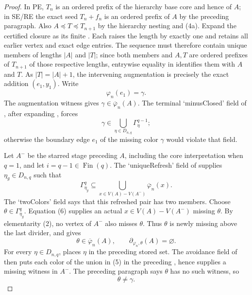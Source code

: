 \begin{proof}
In PE, $T_n$ is an ordered prefix of the hierarchy base core and hence
of $A$; in SE/RE the exact seed $T_n+f_n$ is an ordered prefix of $A$ by
the preceding paragraph.  Also $A\preceq T\preceq T_{n+1}$ by the
hierarchy nesting and (4a).  Expand the certified closure as its finite
.  Each
 raises the length by exactly one and
retains all earlier vertex and exact edge entries.  The sequence must
therefore contain unique members of lengths $|A|$ and $|T|$; since both
members and $A,T$ are ordered prefixes of $T_{n+1}$ of those respective
lengths, entrywise equality in 
identifies them with $A$ and $T$.  As $|T|=|A|+1$, the intervening
augmentation is precisely the exact addition $(e_1,y_1)$.  Write
\[
                         \varphi_n(e_1)=\gamma.                \tag{4}
\]
The augmentation witness gives
$\gamma\in\overline\varphi_n(A)$.  The terminal `minusClosed' field of
, after expanding
, forces
\[
 \gamma\in
   \bigcup_{\eta\in D_{n,q}}\Gamma^{q-1}_\eta;               \tag{5}
\]
otherwise the boundary edge $e_1$ of the missing color $\gamma$ would
violate that field.

Let $A^-$ be the starred stage preceding $A$, including the core
interpretation when $q=1$, and let $i=q-1\in\operatorname{Fin}(q)$.
The `uniqueRefresh' field of  supplies
$\eta_g\in D_{n,q}$ such that
\[
 \Gamma^q_{\eta_g}\subseteq
 \bigcup_{x\in V(A)-V(A^-)}\overline\varphi_n(x).             \tag{6}
\]
The `twoColors' field says that this refreshed pair has two members.
Choose $\theta\in\Gamma^q_{\eta_g}$.  Equation (6) supplies an actual
$x\in V(A)-V(A^-)$ missing $\theta$.  By elementarity (2), no vertex of
$A^-$ also misses $\theta$.  Thus $\theta$ is newly missing above the
last divider, and  gives
\[
 \theta\in\overline\varphi_n(A),\qquad
 \partial_{\varphi_n,\theta}(A)=\varnothing.                 \tag{7}
\]
For every $\eta\in D_{n,q}$,
 places $\eta$ in the preceding
stored set.  The avoidance field of  then puts
each color of the union in (5) in the preceding
, hence supplies a missing witness
in $A^-$.  The preceding paragraph says $\theta$ has no such witness,
so
\[
                         \theta\ne\gamma.                    \tag{8}
\]


\end{proof}
